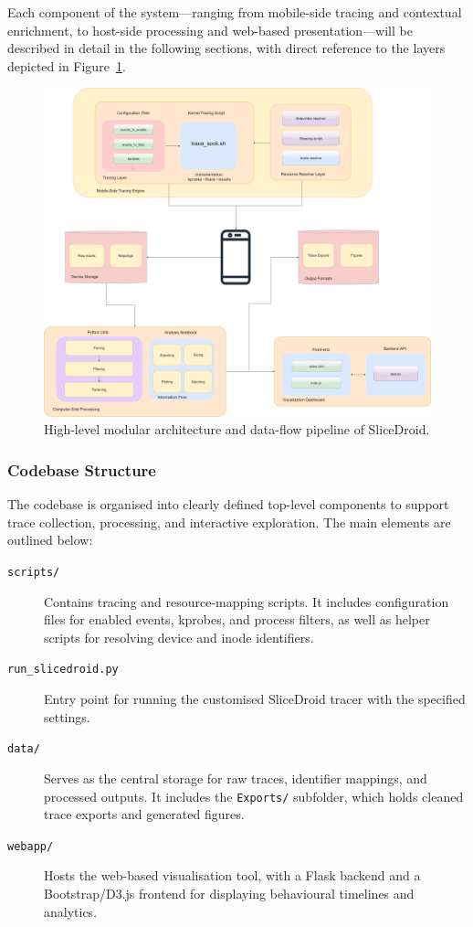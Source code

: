 \documentclass[a4paper,12pt]{report}
\begin{document}
Each component of the system—ranging from mobile-side tracing and contextual enrichment, to host-side processing and web-based presentation—will be described in detail in the following sections, with direct reference to the layers depicted in Figure~\ref{fig:architecture}.
\begin{figure}[H]
\centering
\includegraphics[width=1\textwidth]{architecture.png}
\caption{High-level modular architecture and data-flow pipeline of SliceDroid.}
\label{fig:architecture}
\end{figure}



\subsubsection{Codebase Structure}

The codebase is organised into clearly defined top-level components to support trace collection, processing, and interactive exploration. The main elements are outlined below:

\begin{description}
  \item[\texttt{scripts/}] Contains tracing and resource-mapping scripts. It includes configuration files for enabled events, kprobes, and process filters, as well as helper scripts for resolving device and inode identifiers.

  \item[\texttt{run\_slicedroid.py}] Entry point for running the customised SliceDroid tracer with the specified settings.

  \item[\texttt{data/}] Serves as the central storage for raw traces, identifier mappings, and processed outputs. It includes the \texttt{Exports/} subfolder, which holds cleaned trace exports and generated figures.

  \item[\texttt{webapp/}] Hosts the web-based visualisation tool, with a Flask backend and a Bootstrap/D3.js frontend for displaying behavioural timelines and analytics.
\end{description}
\end{document}
